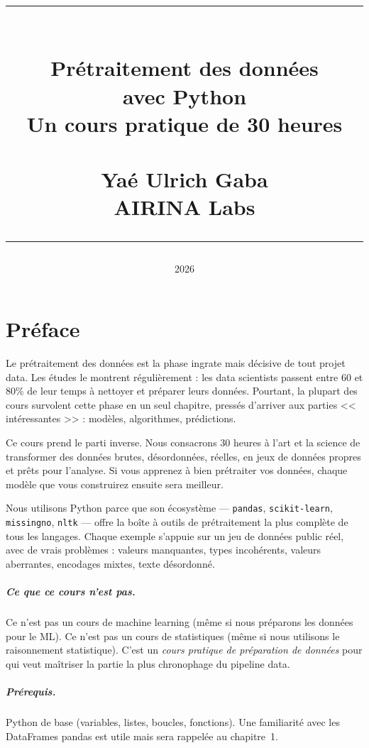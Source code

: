 \documentclass[12pt,a4paper,twoside]{book}
\title{%
  \vspace{-1.5cm}
  \begin{flushleft}
    \textcolor{steelblue}{\rule{0.6\textwidth}{1.5pt}}\\[14pt]
    {\huge\bfseries Prétraitement des données}\\[6pt]
    {\Large\bfseries\color{prepgreen} avec Python}\\[16pt]
    {\normalsize Un cours pratique de 30 heures}\\[18pt]
    \PipelineMotif\\[18pt]
    {\normalsize Yaé Ulrich Gaba}\\[3pt]
    {\small AIRINA Labs}\\[10pt]
    \textcolor{steelblue}{\rule{0.6\textwidth}{0.6pt}}
  \end{flushleft}%
}
\date{2026}
\author{}
\begin{document}
\frontmatter
\maketitle

\tableofcontents
\newpage

\chapter*{Pr\'eface}

Le pr\'etraitement des donn\'ees est la phase ingrate mais d\'ecisive de tout projet data. Les \'etudes le montrent r\'eguli\`erement : les data scientists passent entre 60 et 80\% de leur temps \`a nettoyer et pr\'eparer leurs donn\'ees. Pourtant, la plupart des cours survolent cette phase en un seul chapitre, press\'es d'arriver aux parties << int\'eressantes >> : mod\`eles, algorithmes, pr\'edictions.

Ce cours prend le parti inverse. Nous consacrons 30 heures \`a l'art et la science de transformer des donn\'ees brutes, d\'esordonn\'ees, r\'eelles, en jeux de donn\'ees propres et pr\^ets pour l'analyse. Si vous apprenez \`a bien pr\'etraiter vos donn\'ees, chaque mod\`ele que vous construirez ensuite sera meilleur.

Nous utilisons Python parce que son \'ecosyst\`eme --- \texttt{pandas}, \texttt{scikit-learn}, \texttt{missingno}, \texttt{nltk} --- offre la bo\^ite \`a outils de pr\'etraitement la plus compl\`ete de tous les langages. Chaque exemple s'appuie sur un jeu de donn\'ees public r\'eel, avec de vrais probl\`emes : valeurs manquantes, types incoh\'erents, valeurs aberrantes, encodages mixtes, texte d\'esordonn\'e.

\paragraph{Ce que ce cours n'est pas.} Ce n'est pas un cours de machine learning (m\^eme si nous pr\'eparons les donn\'ees pour le ML). Ce n'est pas un cours de statistiques (m\^eme si nous utilisons le raisonnement statistique). C'est un \emph{cours pratique de pr\'eparation de donn\'ees} pour qui veut ma\^itriser la partie la plus chronophage du pipeline data.

\paragraph{Pr\'erequis.} Python de base (variables, listes, boucles, fonctions). Une familiarit\'e avec les DataFrames pandas est utile mais sera rappel\'ee au chapitre~1.
\end{document}
